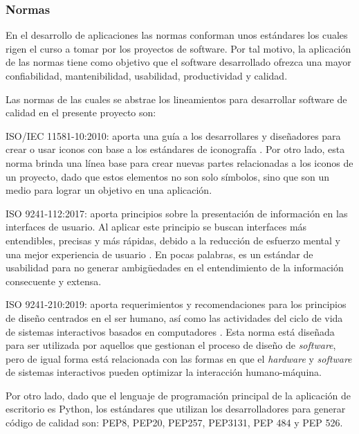 \subsubsection{Normas}
En el desarrollo de aplicaciones las normas conforman unos estándares los cuales rigen el curso a tomar por los proyectos de software. Por tal motivo, la aplicación de las normas tiene como objetivo que el software desarrollado ofrezca una mayor confiabilidad, mantenibilidad, usabilidad, productividad y calidad. 

Las normas de las cuales se abstrae los lineamientos para desarrollar software de calidad en el presente proyecto son:

\begin{APAitemize}
    \item ISO/IEC 11581-10:2010: aporta una guía a los desarrollares y diseñadores para crear o usar iconos con base a los estándares de iconografía \parencite{Iso11581}. Por otro lado, esta norma brinda una línea base para crear nuevas partes relacionadas a los iconos de un proyecto, dado que estos elementos no son solo símbolos, sino que son un medio para lograr un objetivo en una aplicación.
    \item ISO 9241-112:2017: aporta principios sobre la presentación de información en las interfaces de usuario. Al aplicar este principio se buscan interfaces más entendibles, precisas y  más rápidas, debido a la reducción de esfuerzo mental y una mejor experiencia de usuario \parencite{Iso9241-112}. En pocas palabras, es un estándar de usabilidad para no generar ambigüedades en el entendimiento de la información consecuente y extensa.
    \item ISO 9241-210:2019: aporta requerimientos y recomendaciones para los principios de diseño centrados en el ser humano, así como las actividades del ciclo de vida de sistemas interactivos basados en computadores \parencite{Iso9241-210}. Esta norma está diseñada para ser utilizada por aquellos que gestionan el proceso de diseño de \textit{software}, pero de igual forma está relacionada con las formas en que el \textit{hardware} y \textit{software} de sistemas interactivos pueden optimizar la interacción humano-máquina.
\end{APAitemize}

Por otro lado, dado que el lenguaje de programación principal de la aplicación de escritorio es Python, los estándares que utilizan los desarrolladores para generar código de calidad son: PEP8, PEP20, PEP257, PEP3131, PEP 484 y PEP 526.

